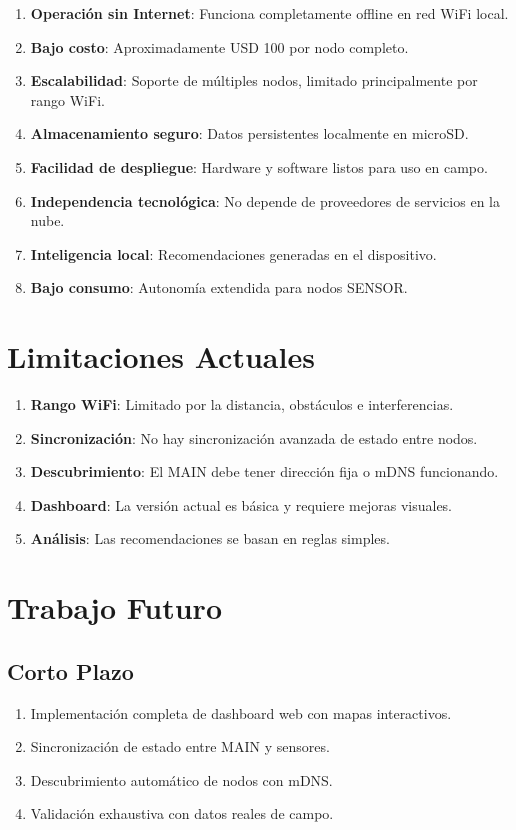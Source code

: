 \documentclass[journal]{IEEEtran}
\begin{document}
\begin{enumerate}
\item \textbf{Operación sin Internet}: Funciona completamente offline en red WiFi local.
\item \textbf{Bajo costo}: Aproximadamente USD 100 por nodo completo.
\item \textbf{Escalabilidad}: Soporte de múltiples nodos, limitado principalmente por rango WiFi.
\item \textbf{Almacenamiento seguro}: Datos persistentes localmente en microSD.
\item \textbf{Facilidad de despliegue}: Hardware y software listos para uso en campo.
\item \textbf{Independencia tecnológica}: No depende de proveedores de servicios en la nube.
\item \textbf{Inteligencia local}: Recomendaciones generadas en el dispositivo.
\item \textbf{Bajo consumo}: Autonomía extendida para nodos SENSOR.
\end{enumerate}

\section{Limitaciones Actuales}

\begin{enumerate}
\item \textbf{Rango WiFi}: Limitado por la distancia, obstáculos e interferencias.
\item \textbf{Sincronización}: No hay sincronización avanzada de estado entre nodos.
\item \textbf{Descubrimiento}: El MAIN debe tener dirección fija o mDNS funcionando.
\item \textbf{Dashboard}: La versión actual es básica y requiere mejoras visuales.
\item \textbf{Análisis}: Las recomendaciones se basan en reglas simples.
\end{enumerate}

\section{Trabajo Futuro}

\subsection{Corto Plazo}

\begin{enumerate}
\item Implementación completa de dashboard web con mapas interactivos.
\item Sincronización de estado entre MAIN y sensores.
\item Descubrimiento automático de nodos con mDNS.
\item Validación exhaustiva con datos reales de campo.
\end{enumerate}
\end{document}
